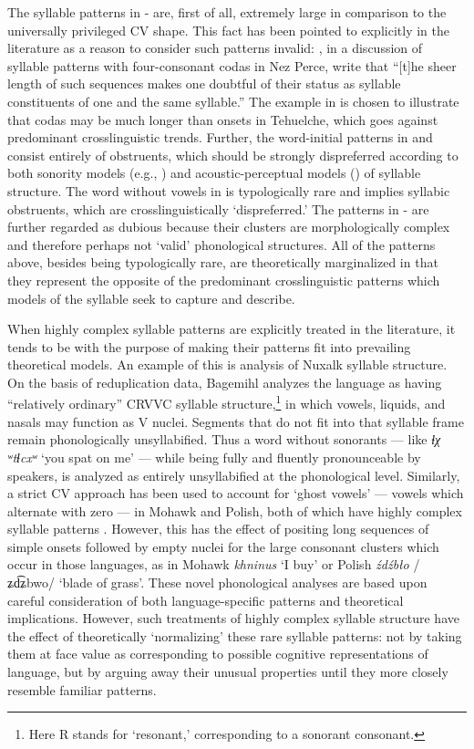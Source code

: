   The syllable patterns in - are, first of all, extremely large in comparison to the universally privileged CV shape. This fact has been pointed to explicitly in the literature as a reason to consider such patterns invalid: \citet[195]{KayeEtAl1990}, in a discussion of syllable patterns with four-consonant codas in Nez Perce, write that “[t]he sheer length of such sequences makes one doubtful of their status as syllable constituents of one and the same syllable.” The example in  is chosen to illustrate that codas may be much longer than onsets in Tehuelche, which goes against predominant crosslinguistic trends. Further, the word-initial patterns in  and  consist entirely of obstruents, which should be strongly dispreferred according to both sonority models (e.g., \citealt{Clements1990}) and acoustic-perceptual models (\citealt{OhalaKawasaki-Fukumori1997}) of syllable structure. The word without vowels in  is typologically rare and implies syllabic obstruents, which are crosslinguistically ‘dispreferred.’ The patterns in - are further regarded as dubious because their clusters are morphologically complex and therefore perhaps not ‘valid’ phonological structures. All of the patterns above, besides being typologically rare, are theoretically marginalized in that they represent the opposite of the predominant crosslinguistic patterns which models of the syllable seek to capture and describe.

  When highly complex syllable patterns are explicitly treated in the literature, it tends to be with the purpose of making their patterns fit into prevailing theoretical models. An example of this is  analysis of Nuxalk syllable structure. On the basis of reduplication data, Bagemihl analyzes the language as having “relatively ordinary” CRVVC syllable structure,\footnote{{Here R stands for ‘resonant,’ corresponding to a sonorant consonant.}} in which vowels, liquids, and nasals may function as V nuclei. Segments that do not fit into that syllable frame remain phonologically unsyllabified. Thus a word without sonorants — like \textit{ɬχ ʷtɬcxʷ} ‘you spat on me’ — while being fully and fluently pronounceable by speakers, is analyzed as entirely unsyllabified at the phonological level. Similarly, a strict CV approach has been used to account for ‘ghost vowels’ — vowels which alternate with zero — in Mohawk and Polish, both of which have highly complex syllable patterns \citep{Rowicka1999}. However, this has the effect of positing long sequences of simple onsets followed by empty nuclei for the large consonant clusters which occur in those languages, as in Mohawk \textit{khninus} ‘I buy’ or Polish \textit{źdźbło} /ʑd͡ʑbwo/ ‘blade of grass’. These novel phonological analyses are based upon careful consideration of both language-specific patterns and theoretical implications. However, such treatments of highly complex syllable structure have the effect of theoretically ‘normalizing’ these rare syllable patterns: not by taking them at face value as corresponding to possible cognitive representations of language, but by arguing away their unusual properties until they more closely resemble familiar patterns.

